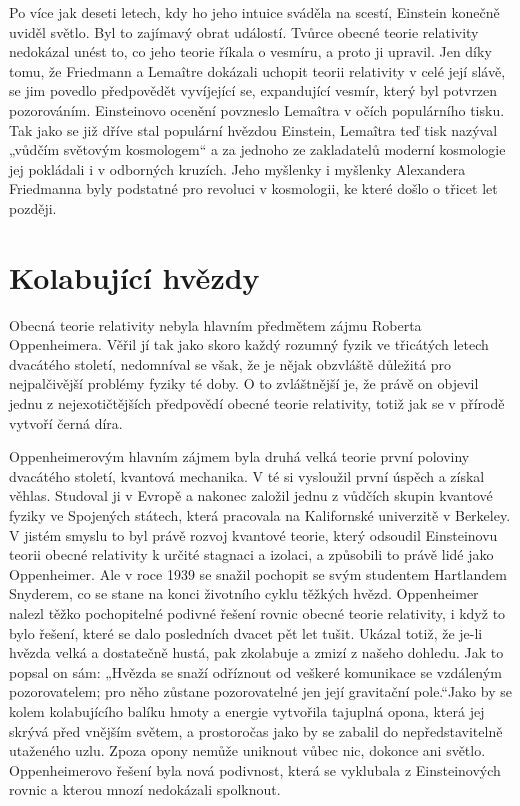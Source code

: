  Po více jak deseti letech, kdy ho jeho intuice sváděla na scestí, Einstein konečně uviděl světlo.
  Byl to zajímavý obrat událostí. Tvůrce obecné teorie relativity nedokázal unést to, co jeho teorie
  říkala o vesmíru, a proto ji upravil. Jen díky tomu, že Friedmann a Lemaître dokázali uchopit
  teorii relativity v celé její slávě, se jim povedlo předpovědět vyvíjející se, expandující vesmír,
  který byl potvrzen pozorováním. Einsteinovo ocenění povzneslo Lemaîtra v očích populárního tisku.
  Tak jako se již dříve stal populární hvězdou Einstein, Lemaîtra teď tisk nazýval „vůdčím světovým
  kosmologem“ a za jednoho ze zakladatelů moderní kosmologie jej pokládali i v odborných kruzích.
  Jeho myšlenky i myšlenky Alexandera Friedmanna byly podstatné pro revoluci v kosmologii, ke které
  došlo o třicet let později.

\section{Kolabující hvězdy}\label{feyIchIIIsecV} 
  Obecná teorie relativity nebyla hlavním předmětem zájmu Roberta Oppenheimera. Věřil jí tak jako
  skoro každý rozumný fyzik ve třicátých letech dvacátého století, nedomníval se však, že je nějak
  obzvláště důležitá pro nejpalčivější problémy fyziky té doby. O to zvláštnější je, že právě on
  objevil jednu z nejexotičtějších předpovědí obecné teorie relativity, totiž jak se v přírodě
  vytvoří černá díra. 
  
  Oppenheimerovým hlavním zájmem byla druhá velká teorie první poloviny dvacátého století, kvantová
  mechanika. V té si vysloužil první úspěch a získal věhlas. Studoval ji v Evropě a nakonec založil
  jednu z vůdčích skupin kvantové fyziky ve Spojených státech, která pracovala na Kalifornské
  univerzitě v Berkeley. V jistém smyslu to byl právě rozvoj kvantové teorie, který odsoudil
  Einsteinovu teorii obecné relativity k určité stagnaci a izolaci, a způsobili to právě lidé jako
  Oppenheimer. Ale v roce 1939 se snažil pochopit se svým studentem Hartlandem Snyderem, co se stane
  na konci životního cyklu těžkých hvězd. Oppenheimer nalezl těžko pochopitelné podivné řešení
  rovnic obecné teorie relativity, i když to bylo řešení, které se dalo posledních dvacet pět let
  tušit. Ukázal totiž, že je-li hvězda velká a dostatečně hustá, pak zkolabuje a zmizí z našeho
  dohledu. Jak to popsal on sám: „Hvězda se snaží odříznout od veškeré komunikace se vzdáleným
  pozorovatelem; pro něho zůstane pozorovatelné jen její gravitační pole.“Jako by se kolem
  kolabujícího balíku hmoty a energie vytvořila tajuplná opona, která jej skrývá před vnějším
  světem, a prostoročas jako by se zabalil do nepředstavitelně utaženého uzlu. Zpoza opony nemůže
  uniknout vůbec nic, dokonce ani světlo. Oppenheimerovo řešení byla nová podivnost, která se
  vyklubala z Einsteinových rovnic a kterou mnozí nedokázali spolknout. 
  
